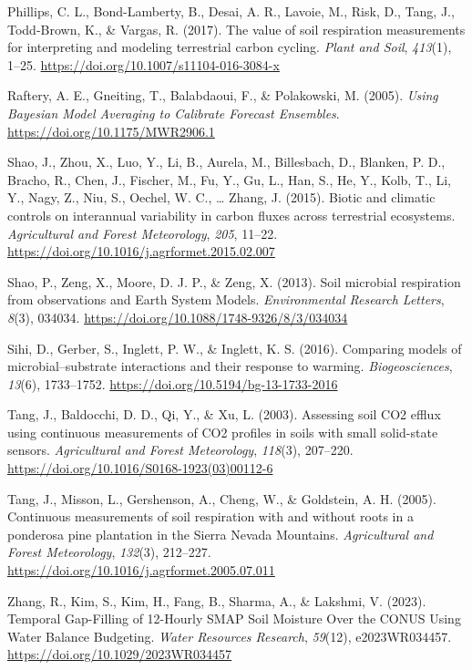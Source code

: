 \documentclass[
  letterpaper,
  DIV=11,
  numbers=noendperiod]{scrartcl}
\newlength{\cslhangindent}
\newenvironment{CSLReferences}[2] %
 {\begin{list}{}{%
  \setlength{\itemindent}{0pt}
  \setlength{\leftmargin}{0pt}
  \setlength{\parsep}{0pt}
  \ifodd #1
   \setlength{\leftmargin}{\cslhangindent}
   \setlength{\itemindent}{-1\cslhangindent}
  \fi
  \setlength{\itemsep}{#2\baselineskip}}}
 {\end{list}}
\begin{document}
\begin{CSLReferences}{1}{0}
Phillips, C. L., Bond-Lamberty, B., Desai, A. R., Lavoie, M., Risk, D.,
Tang, J., Todd-Brown, K., \& Vargas, R. (2017). The value of soil
respiration measurements for interpreting and modeling terrestrial
carbon cycling. \emph{Plant and Soil}, \emph{413}(1), 1--25.
\url{https://doi.org/10.1007/s11104-016-3084-x}

Raftery, A. E., Gneiting, T., Balabdaoui, F., \& Polakowski, M. (2005).
\emph{Using {Bayesian Model Averaging} to {Calibrate Forecast
Ensembles}}. \url{https://doi.org/10.1175/MWR2906.1}

Shao, J., Zhou, X., Luo, Y., Li, B., Aurela, M., Billesbach, D.,
Blanken, P. D., Bracho, R., Chen, J., Fischer, M., Fu, Y., Gu, L., Han,
S., He, Y., Kolb, T., Li, Y., Nagy, Z., Niu, S., Oechel, W. C., \ldots{}
Zhang, J. (2015). Biotic and climatic controls on interannual
variability in carbon fluxes across terrestrial ecosystems.
\emph{Agricultural and Forest Meteorology}, \emph{205}, 11--22.
\url{https://doi.org/10.1016/j.agrformet.2015.02.007}

Shao, P., Zeng, X., Moore, D. J. P., \& Zeng, X. (2013). Soil microbial
respiration from observations and {Earth System Models}.
\emph{Environmental Research Letters}, \emph{8}(3), 034034.
\url{https://doi.org/10.1088/1748-9326/8/3/034034}

Sihi, D., Gerber, S., Inglett, P. W., \& Inglett, K. S. (2016).
Comparing models of microbial--substrate interactions and their response
to warming. \emph{Biogeosciences}, \emph{13}(6), 1733--1752.
\url{https://doi.org/10.5194/bg-13-1733-2016}

Tang, J., Baldocchi, D. D., Qi, Y., \& Xu, L. (2003). Assessing soil
{CO2} efflux using continuous measurements of {CO2} profiles in soils
with small solid-state sensors. \emph{Agricultural and Forest
Meteorology}, \emph{118}(3), 207--220.
\url{https://doi.org/10.1016/S0168-1923(03)00112-6}

Tang, J., Misson, L., Gershenson, A., Cheng, W., \& Goldstein, A. H.
(2005). Continuous measurements of soil respiration with and without
roots in a ponderosa pine plantation in the {Sierra Nevada Mountains}.
\emph{Agricultural and Forest Meteorology}, \emph{132}(3), 212--227.
\url{https://doi.org/10.1016/j.agrformet.2005.07.011}

Zhang, R., Kim, S., Kim, H., Fang, B., Sharma, A., \& Lakshmi, V.
(2023). Temporal {Gap-Filling} of 12-{Hourly SMAP Soil Moisture Over}
the {CONUS Using Water Balance Budgeting}. \emph{Water Resources
Research}, \emph{59}(12), e2023WR034457.
\url{https://doi.org/10.1029/2023WR034457}

\end{CSLReferences}
\end{document}
